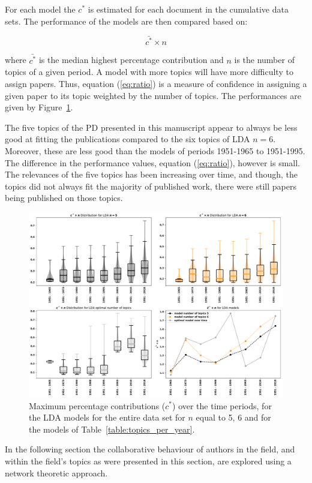 \documentclass{article}
\theoremstyle{definition}
\begin{document}
For each model the \(c^*\) is estimated for each document in the cumulative data
sets. The performance of the models are then compared based on:

\begin{equation}\label{eq:ratio}
    \bar{c^*} \times n
\end{equation}

where \(\bar{c^*}\) is the median highest percentage contribution and \(n\)
is the number of topics of a given period. A model with more topics will have more
difficulty to assign papers. Thus, equation (\ref{eq:ratio}) is a measure of confidence
in assigning a given paper to its topic weighted by the number of topics.
The performances are
given by Figure~\ref{fig:median_percentage_contribution_over_time}.

The five topics of the PD presented in this manuscript appear to always be
less good at fitting the publications compared to the six topics of LDA \(n=6\).
Moreover, these are less good than the models of periods 1951-1965 to 1951-1995.
The difference in the performance values, equation (\ref{eq:ratio}),
however is small. The relevances of the five topics has been increasing
over time, and though, the topics did not always fit the majority of published
work, there were still papers being published on those topics.

\begin{figure}[!hbtp]
    \centering
    \includegraphics[width=.75\textwidth]{contribution_over_time.pdf}
    \caption{Maximum percentage contributions (\(c^*\)) over the time periods,
    for the LDA models for the entire data set for \(n\) equal to 5, 6
    and for the models of Table~\ref{table:topics_per_year}.}
    \label{fig:median_percentage_contribution_over_time}
\end{figure}

In the following section the collaborative behaviour of authors in the field,
and within the field's topics as were presented in this section, are explored
using a network theoretic approach.
\end{document}
